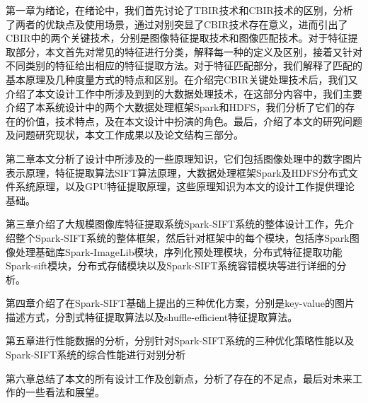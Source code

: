 第一章为绪论，在绪论中，我们首先讨论了TBIR技术和CBIR技术的区别，分析了两者的优缺点及使用场景，通过对别突显了CBIR技术存在意义，进而引出了CBIR中的两个关键技术，分别是图像特征提取技术和图像匹配技术。对于特征提取部分，本文首先对常见的特征进行分类，解释每一种的定义及区别，接着又针对不同类别的特征给出相应的特征提取方法。对于特征匹配部分，我们解释了匹配的基本原理及几种度量方式的特点和区别。在介绍完CBIR关键处理技术后，我们又介绍了本文设计工作中所涉及到到的大数据处理技术，在这部分内容中，我们主要介绍了本系统设计中的两个大数据处理框架Spark和HDFS，我们分析了它们的存在的价值，技术特点，及在本文设计中扮演的角色。最后，介绍了本文的研究问题及问题研究现状，本文工作成果以及论文结构三部分。

第二章本文分析了设计中所涉及的一些原理知识，它们包括图像处理中的数字图片表示原理，特征提取算法SIFT算法原理，大数据处理框架Spark及HDFS分布式文件系统原理，以及GPU特征提取原理，这些原理知识为本文的设计工作提供理论基础。

第三章介绍了大规模图像库特征提取系统Spark-SIFT系统的整体设计工作，先介绍整个Spark-SIFT系统的整体框架，然后针对框架中的每个模块，包括序Spark图像处理基础库Spark-ImageLib模块，序列化预处理模块，分布式特征提取功能Spark-sift模块，分布式存储模块以及Spark-SIFT系统容错模块等进行详细的分析。

第四章介绍了在Spark-SIFT基础上提出的三种优化方案，分别是key-value的图片描述方式，分割式特征提取算法以及shuffle-efficient特征提取算法。

第五章进行性能数据的分析，分别针对Spark-SIFT系统的三种优化策略性能以及Spark-SIFT系统的综合性能进行对别分析

第六章总结了本文的所有设计工作及创新点，分析了存在的不足点，最后对未来工作的一些看法和展望。


